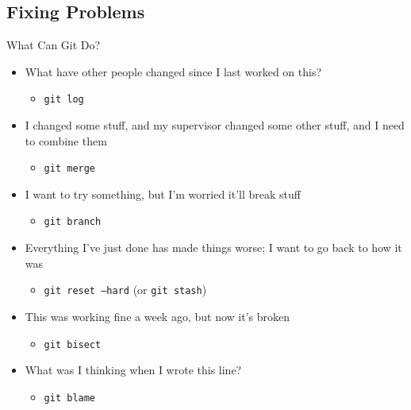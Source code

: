 \subsection{Fixing Problems}

\begin{frame}{What Can Git Do?}
	\begin{itemize}
		\item What have other people changed since I last worked on this?
		\begin{itemize}
			\item \texttt{git log}
		\end{itemize}
		\item I changed some stuff, and my supervisor changed some other stuff, and I need to combine them
		\begin{itemize}
			\item \texttt{git merge}
		\end{itemize}
		\item I want to try something, but I'm worried it'll break stuff
		\begin{itemize}
			\item \texttt{git branch}
		\end{itemize}
		\item Everything I've just done has made things worse; I want to go back to how it was
		\begin{itemize}
			\item \texttt{git reset --hard} (or \texttt{git stash})
		\end{itemize}
		\item This was working fine a week ago, but now it's broken
		\begin{itemize}
			\item \texttt{git bisect}
		\end{itemize}
		\item What was I thinking when I wrote this line?
		\begin{itemize}
			\item \texttt{git blame}
		\end{itemize}
	\end{itemize}
\end{frame}

